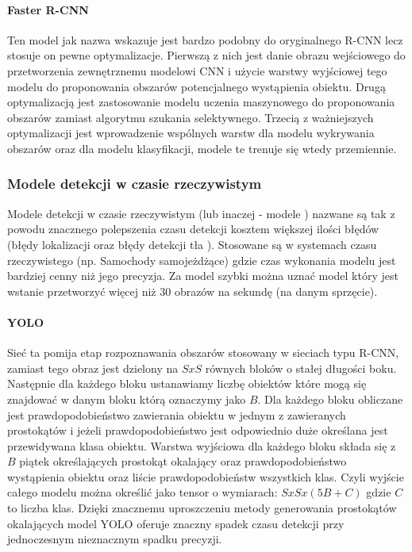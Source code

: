 \paragraph{Faster R-CNN}
Ten model jak nazwa wskazuje jest bardzo podobny do oryginalnego R-CNN lecz stosuje on pewne optymalizacje. Pierwszą z nich jest danie obrazu wejściowego do przetworzenia zewnętrznemu modelowi CNN i użycie warstwy wyjściowej tego modelu do proponowania obszarów potencjalnego wystąpienia obiektu. Drugą optymalizacją jest zastosowanie modelu uczenia maszynowego do proponowania obszarów zamiast algorytmu szukania selektywnego.\cite{ORdum-1} Trzecią z ważniejszych optymalizacji jest wprowadzenie wspólnych warstw dla modelu wykrywania obszarów oraz dla modelu klasyfikacji, modele te trenuje się wtedy przemiennie. \cite{ORdum-3}

\subsubsection{Modele detekcji w czasie rzeczywistym}
Modele detekcji w czasie rzeczywistym (lub inaczej - modele ) nazwane są tak z powodu znacznego polepszenia czasu detekcji kosztem większej ilości błędów (błędy lokalizacji oraz błędy detekcji tła \cite[p.~6]{YOLOnet}). Stosowane są w systemach czasu rzeczywistego (np. Samochody samojeżdżące) gdzie czas wykonania modelu jest bardziej cenny niż jego precyzja. Za model szybki można uznać model który jest wstanie przetworzyć więcej niż 30 obrazów na sekundę (na danym sprzęcie).\cite[p.~5]{YOLOnet}
\paragraph{YOLO}
Sieć ta pomija etap rozpoznawania obszarów stosowany w sieciach typu R-CNN, zamiast tego obraz jest dzielony na $SxS$ równych bloków o stałej długości boku. Następnie dla każdego bloku ustanawiamy liczbę obiektów które mogą się znajdować w danym bloku którą oznaczymy jako $B$. Dla każdego bloku obliczane jest prawdopodobieństwo zawierania obiektu w jednym z zawieranych prostokątów i jeżeli prawdopodobieństwo jest odpowiednio duże określana jest przewidywana klasa obiektu. Warstwa wyjściowa dla każdego bloku składa się z $B$ piątek określających prostokąt okalający oraz prawdopodobieństwo wystąpienia obiektu oraz liście prawdopodobieństw wszystkich klas. Czyli wyjście całego modelu można określić jako tensor o wymiarach: $SxSx(5B+C)$ gdzie $C$ to liczba klas.\cite{ORdum-4} Dzięki znacznemu uproszczeniu metody generowania prostokątów okalających model YOLO oferuje znaczny spadek czasu detekcji przy jednoczesnym nieznacznym spadku precyzji. \cite{YOLOnet} 
